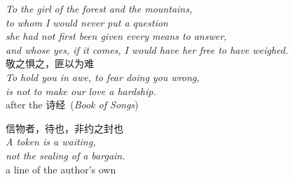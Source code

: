 \documentclass[11pt,a4paper]{article}
\begin{document}
\clearpage
\thispagestyle{empty}
\vspace*{0.20\textheight}
\begin{center}
{\itshape\color{ink}
To the girl of the forest and the mountains,\\[0.4em]
to whom I would never put a question\\[0.25em]
she had not first been given every means to answer,\\[0.25em]
and whose yes, if it comes, I would have her free to have weighed.\\}
\vspace{2.6em}
{\cjkfont\large\color{rosedeep} 敬之惧之，匪以为难}\\[0.8em]
{\itshape\small\color{rosedeep}
To hold you in awe, to fear doing you wrong,\\[0.18em]
is not to make our love a hardship.}\\[1.0em]
{\footnotesize\color{lightgold}after the \cjkfont 诗经\/{\normalfont\ (\textit{Book of Songs})}}
\vspace{2.4em}

{\cjkfont\large\color{rosedeep} 信物者，待也，非约之封也}\\[0.8em]
{\itshape\small\color{rosedeep}
A token is a waiting,\\[0.18em]
not the sealing of a bargain.}\\[1.0em]
{\footnotesize\color{lightgold}a line of the author's own}
\end{center}
\vfill
\clearpage
\end{document}
